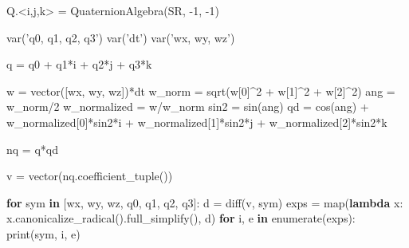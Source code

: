 \documentclass[]{article}
\newenvironment{Shaded}{}{}
\newcommand{\KeywordTok}[1]{\textcolor[rgb]{0.00,0.44,0.13}{\textbf{#1}}}
\newcommand{\DecValTok}[1]{\textcolor[rgb]{0.25,0.63,0.44}{#1}}
\newcommand{\StringTok}[1]{\textcolor[rgb]{0.25,0.44,0.63}{#1}}
\newcommand{\ControlFlowTok}[1]{\textcolor[rgb]{0.00,0.44,0.13}{\textbf{#1}}}
\newcommand{\OperatorTok}[1]{\textcolor[rgb]{0.40,0.40,0.40}{#1}}
\newcommand{\BuiltInTok}[1]{#1}
\newcommand{\NormalTok}[1]{#1}
\begin{document}
\begin{Shaded}
\begin{Highlighting}[]
\NormalTok{Q.}\OperatorTok{<}\NormalTok{i,j,k}\OperatorTok{>} \OperatorTok{=}\NormalTok{ QuaternionAlgebra(SR, }\OperatorTok{-}\DecValTok{1}\NormalTok{, }\OperatorTok{-}\DecValTok{1}\NormalTok{)}

\NormalTok{var(}\StringTok{'q0, q1, q2, q3'}\NormalTok{)}
\NormalTok{var(}\StringTok{'dt'}\NormalTok{)}
\NormalTok{var(}\StringTok{'wx, wy, wz'}\NormalTok{)}

\NormalTok{q }\OperatorTok{=}\NormalTok{ q0 }\OperatorTok{+}\NormalTok{ q1}\OperatorTok{*}\NormalTok{i }\OperatorTok{+}\NormalTok{ q2}\OperatorTok{*}\NormalTok{j }\OperatorTok{+}\NormalTok{ q3}\OperatorTok{*}\NormalTok{k}

\NormalTok{w }\OperatorTok{=}\NormalTok{ vector([wx, wy, wz])}\OperatorTok{*}\NormalTok{dt}
\NormalTok{w_norm }\OperatorTok{=}\NormalTok{ sqrt(w[}\DecValTok{0}\NormalTok{]}\OperatorTok{^}\DecValTok{2} \OperatorTok{+}\NormalTok{ w[}\DecValTok{1}\NormalTok{]}\OperatorTok{^}\DecValTok{2} \OperatorTok{+}\NormalTok{ w[}\DecValTok{2}\NormalTok{]}\OperatorTok{^}\DecValTok{2}\NormalTok{)}
\NormalTok{ang }\OperatorTok{=}\NormalTok{ w_norm}\OperatorTok{/}\DecValTok{2}
\NormalTok{w_normalized }\OperatorTok{=}\NormalTok{ w}\OperatorTok{/}\NormalTok{w_norm}
\NormalTok{sin2 }\OperatorTok{=}\NormalTok{ sin(ang)}
\NormalTok{qd }\OperatorTok{=}\NormalTok{ cos(ang) }\OperatorTok{+}\NormalTok{ w_normalized[}\DecValTok{0}\NormalTok{]}\OperatorTok{*}\NormalTok{sin2}\OperatorTok{*}\NormalTok{i }\OperatorTok{+}\NormalTok{ w_normalized[}\DecValTok{1}\NormalTok{]}\OperatorTok{*}\NormalTok{sin2}\OperatorTok{*}\NormalTok{j }\OperatorTok{+}\NormalTok{ w_normalized[}\DecValTok{2}\NormalTok{]}\OperatorTok{*}\NormalTok{sin2}\OperatorTok{*}\NormalTok{k}

\NormalTok{nq }\OperatorTok{=}\NormalTok{ q}\OperatorTok{*}\NormalTok{qd}

\NormalTok{v }\OperatorTok{=}\NormalTok{ vector(nq.coefficient_tuple())}

\ControlFlowTok{for}\NormalTok{ sym }\KeywordTok{in}\NormalTok{ [wx, wy, wz, q0, q1, q2, q3]:}
\NormalTok{    d }\OperatorTok{=}\NormalTok{ diff(v, sym)}
\NormalTok{    exps }\OperatorTok{=} \BuiltInTok{map}\NormalTok{(}\KeywordTok{lambda}\NormalTok{ x: x.canonicalize_radical().full_simplify(), d)}
    \ControlFlowTok{for}\NormalTok{ i, e }\KeywordTok{in} \BuiltInTok{enumerate}\NormalTok{(exps):}
        \BuiltInTok{print}\NormalTok{(sym, i, e) }
        

\end{Highlighting}
\end{Shaded}
\end{document}
